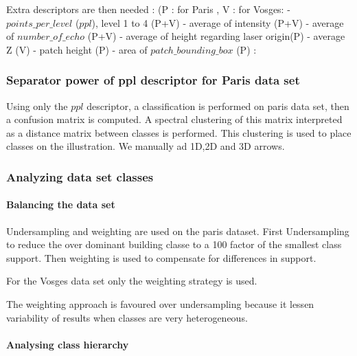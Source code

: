 		Extra descriptors are then needed :  (P : for Paris , V : for Vosges: 
		- $points\_per\_level$ ($ppl$), level 1 to 4 (P+V)
		- average of intensity (P+V)
		- average of $number\_of\_echo$ (P+V)
		- average of height regarding laser origin(P)
		- average Z (V)
		- patch height (P)
		- area of $patch\_bounding\_box$ (P) : 
		
		\subsubsection{Separator power of ppl descriptor for Paris data set}
			
			
			Using only the $ppl$ descriptor, a classification is performed on paris data set, then a confusion matrix is computed.
			A spectral clustering of this matrix interpreted as a distance matrix between classes is performed. This clustering is used to place classes on the illustration.
			We manually ad 1D,2D and 3D arrows. 
		
		\subsubsection{Analyzing data set classes}
			\paragraph{Balancing the data set}  
				Undersampling and weighting are used on the paris dataset. First Undersampling to reduce the over dominant building classe to a 100 factor of the smallest class support. Then weighting is used to compensate for differences in support.
				
				For the Vosges data set only the weighting strategy is used.
				
				The weighting approach is favoured over undersampling because it lessen variability of results when classes are very heterogeneous.
				
				
			\paragraph{Analysing class hierarchy} 
		 
